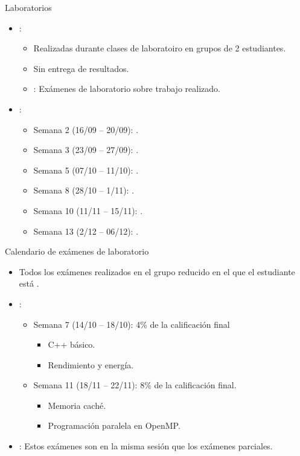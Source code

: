 \begin{frame}[t]{Laboratorios}
\begin{itemize}
  \item {}:
    \begin{itemize}
      \item Realizadas durante clases de laboratoiro en grupos de 2 estudiantes.
      \item Sin entrega de resultados.
      \item {}: Exámenes de laboratorio sobre trabajo realizado.
    \end{itemize}

  \item {}:
    \begin{itemize}
      \item Semana 2 (16/09 -- 20/09): .
      \item Semana 3 (23/09 -- 27/09): .
      \item Semana 5 (07/10 -- 11/10): .
      \item Semana 8 (28/10 -- 1/11): .
      \item Semana 10 (11/11 -- 15/11): .
      \item Semana 13 (2/12 -- 06/12): .
    \end{itemize}
\end{itemize}
\end{frame}

\begin{frame}[t]{Calendario de exámenes de laboratorio}
\begin{itemize}
  \item Todos los exámenes realizados en el grupo reducido
        en el que el estudiante está .

  \vfill
  \item {}:
  \begin{itemize}
    \item Semana 7 (14/10 -- 18/10): 4\% de la calificación final
      \begin{itemize}
        \item C++ básico.
        \item Rendimiento y energía.
      \end{itemize}
    \item Semana 11 (18/11 -- 22/11): 8\% de la calificación final.
      \begin{itemize}
        \item Memoria caché.
        \item Programación paralela en OpenMP.
      \end{itemize}
  \end{itemize}

  \item {}: Estos exámenes son en la misma sesión que 
        los exámenes parciales.
\end{itemize}
\end{frame}

